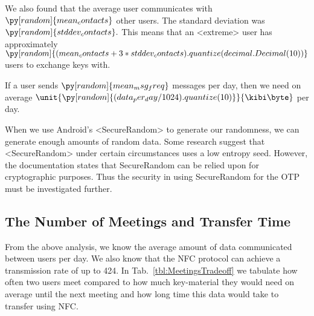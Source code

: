 We also found that the average user communicates with
\(\py[random]{mean_contacts}\)
other users.
The standard deviation was
\(\py[random]{stddev_contacts}.\)
This means that an <extreme> user has approximately
\(\py[random]{(mean_contacts 
+ 3*stddev_contacts).quantize(decimal.Decimal(10))}\)
users to exchange keys with.

\reversemarginpar
{}
\reversemarginpar
If a user sends
\(\py[random]{mean_msg_freq}\)
messages per day, then we need on average
\(\unit{\py[random]{(data_per_day/1024).quantize( 10 )}}{\kibi\byte}\)
per day.

When we use Android's <SecureRandom> to generate our randomness, we can 
generate enough amounts of random data.
Some research \cite{AndroidLowEntropyMyth,JavaRandomness} suggest that 
<SecureRandom> under certain circumstances uses a low entropy seed.
However, the documentation states that SecureRandom can be relied upon for 
cryptographic purposes.
Thus the security in using SecureRandom for the \ac{OTP} must be investigated 
further.

\subsection{The Number of Meetings and Transfer Time}
\label{sec:Meetings}
From the above analysis, we know the average amount of data communicated 
between users per day.
We also know that the \ac{NFC} protocol can achieve a transmission rate of up 
to \unit{424}{\kilo\bit\per\second}.
In Tab.~\ref{tbl:MeetingsTradeoff} we tabulate how often two users meet 
compared to how much key-material they would need on average until the next 
meeting and how long time this data would take to transfer using \ac{NFC}.


